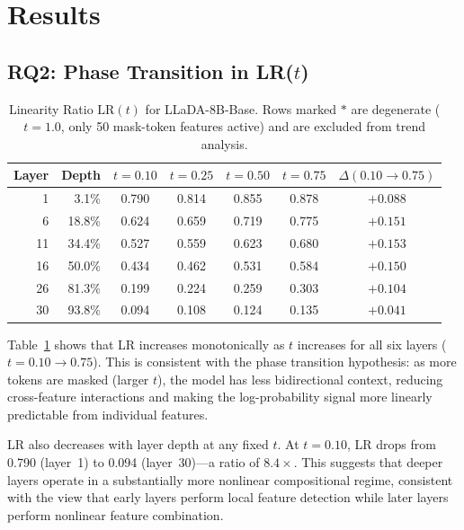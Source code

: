\documentclass[11pt]{article}
\newcommand{\LR}{\mathrm{LR}}
\begin{document}
\section{Results}

\subsection{RQ2: Phase Transition in LR($t$)}

\begin{table}[h]
\centering
\caption{Linearity Ratio $\LR(t)$ for LLaDA-8B-Base. Rows marked $*$ are degenerate ($t = 1.0$, only 50 mask-token features active) and are excluded from trend analysis.}
\label{tab:lr_dlm}
\begin{tabular}{rr cccc c}
\toprule
\textbf{Layer} & \textbf{Depth} & $t=0.10$ & $t=0.25$ & $t=0.50$ & $t=0.75$ & $\Delta(0.10 \to 0.75)$ \\
\midrule
1  & 3.1\%  & 0.790 & 0.814 & 0.855 & 0.878 & $+0.088$ \\
6  & 18.8\% & 0.624 & 0.659 & 0.719 & 0.775 & $+0.151$ \\
11 & 34.4\% & 0.527 & 0.559 & 0.623 & 0.680 & $+0.153$ \\
16 & 50.0\% & 0.434 & 0.462 & 0.531 & 0.584 & $+0.150$ \\
26 & 81.3\% & 0.199 & 0.224 & 0.259 & 0.303 & $+0.104$ \\
30 & 93.8\% & 0.094 & 0.108 & 0.124 & 0.135 & $+0.041$ \\
\bottomrule
\end{tabular}
\end{table}

Table~\ref{tab:lr_dlm} shows that LR increases monotonically as $t$ increases for all six layers ($t = 0.10 \to 0.75$).
This is consistent with the phase transition hypothesis: as more tokens are masked (larger $t$), the model has less bidirectional context, reducing cross-feature interactions and making the log-probability signal more linearly predictable from individual features.

LR also decreases with layer depth at any fixed $t$. At $t = 0.10$, LR drops from 0.790 (layer~1) to 0.094 (layer~30)---a ratio of $8.4\times$. This suggests that deeper layers operate in a substantially more nonlinear compositional regime, consistent with the view that early layers perform local feature detection while later layers perform nonlinear feature combination.
\end{document}
